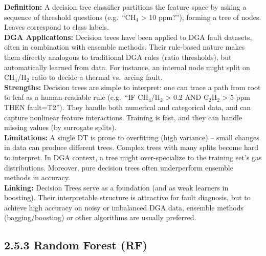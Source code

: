 \textbf{Definition:} A decision tree classifier partitions the feature
space by asking a sequence of threshold questions (e.g.~``CH$_4$
\textgreater{} 10 ppm?''), forming a tree of nodes. Leaves correspond to
class labels.\\
\textbf{DGA Applications:} Decision trees have been applied to DGA fault
datasets, often in combination with ensemble methods. Their rule-based
nature makes them directly analogous to traditional DGA rules (ratio
thresholds), but automatically learned from data. For instance, an
internal node might split on CH$_4$/H$_2$ ratio to decide a thermal vs.~arcing
fault.\\
\textbf{Strengths:} Decision trees are simple to interpret: one can
trace a path from root to leaf as a human-readable rule (e.g.~``IF
CH$_4$/H$_2$ \textgreater{} 0.2 AND C$_2$H$_2$ \textgreater{} 5 ppm THEN
fault=T2''). They handle both numerical and categorical data, and can
capture nonlinear feature interactions. Training is fast, and they can
handle missing values (by surrogate splits).\\
\textbf{Limitations:} A single DT is prone to overfitting (high
variance) -- small changes in data can produce different trees. Complex
trees with many splits become hard to interpret. In DGA context, a tree
might over-specialize to the training set's gas distributions. Moreover,
pure decision trees often underperform ensemble methods in accuracy.\\
\textbf{Linking:} Decision Trees serve as a foundation (and as weak
learners in boosting). Their interpretable structure is attractive for
fault diagnosis, but to achieve high accuracy on noisy or imbalanced DGA
data, ensemble methods (bagging/boosting) or other algorithms are
usually preferred.

\subsection{2.5.3 Random Forest (RF)}\label{random-forest-rf}

